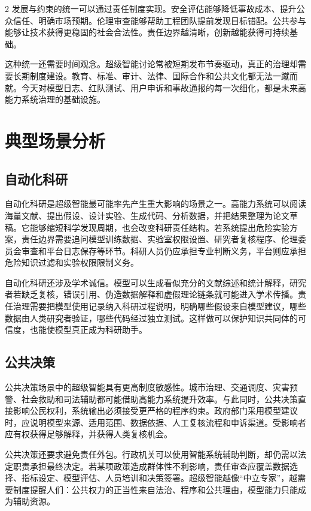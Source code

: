 \documentclass[a4paper,UTF8,zihao=5,twoside]{ctexart}
\begin{document}
\begin{multicols}{2}
发展与约束的统一可以通过责任制度实现。安全评估能够降低事故成本、提升公众信任、明确市场预期。伦理审查能够帮助工程团队提前发现目标错配。公共参与能够让技术获得更稳固的社会合法性。责任边界越清晰，创新越能获得可持续基础。

这种统一还需要时间观念。超级智能讨论常被短期发布节奏驱动，真正的治理却需要长期制度建设。教育、标准、审计、法律、国际合作和公共文化都无法一蹴而就。今天对模型日志、红队测试、用户申诉和事故通报的每一次细化，都是未来高能力系统治理的基础设施。

\section{典型场景分析}

\subsection{自动化科研}

自动化科研是超级智能最可能率先产生重大影响的场景之一。高能力系统可以阅读海量文献、提出假设、设计实验、生成代码、分析数据，并把结果整理为论文草稿。它能够缩短科学发现周期，也会改变科研责任结构。若系统提出危险实验方案，责任边界需要追问模型训练数据、实验室权限设置、研究者复核程序、伦理委员会审查和平台日志保存等环节。科研人员仍应承担专业判断义务，平台则应承担危险知识过滤和实验权限限制义务。

自动化科研还涉及学术诚信。模型可以生成看似充分的文献综述和统计解释，研究者若缺乏复核，错误引用、伪造数据解释和虚假理论链条就可能进入学术传播。责任治理需要把模型使用记录纳入科研过程说明，明确哪些假设来自模型建议，哪些数据由人类研究者验证，哪些代码经过独立测试。这样做可以保护知识共同体的可信度，也能使模型真正成为科研助手。

\subsection{公共决策}

公共决策场景中的超级智能具有更高制度敏感性。城市治理、交通调度、灾害预警、社会救助和司法辅助都可能借助高能力系统提升效率。与此同时，公共决策直接影响公民权利，系统输出必须接受更严格的程序约束。政府部门采用模型建议时，应说明模型来源、适用范围、数据依据、人工复核流程和申诉渠道。受影响者应有权获得足够解释，并获得人类复核机会。

公共决策还要求避免责任外包。行政机关可以使用智能系统辅助判断，却仍需以法定职责承担最终决定。若某项政策造成群体性不利影响，责任审查应覆盖数据选择、指标设定、模型评估、人员培训和决策签署。超级智能越像“中立专家”，越需要制度提醒人们：公共权力的正当性来自法治、程序和公共理由，模型能力只能成为辅助资源。


\end{multicols}
\end{document}

